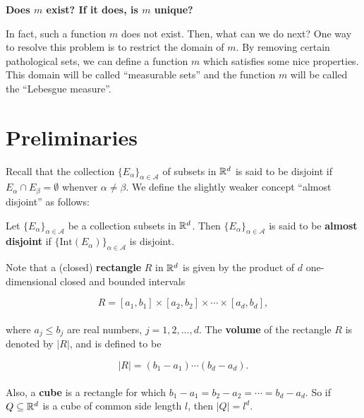 \documentclass[12pt, a4paper, openany, twoside]{book}
\theoremstyle{definition}
\theoremstyle{remark}
\newcommand{\Int}{{\mathrm{Int}}}
\theoremstyle{plain}
\numberwithin{equation}{section}
\begin{document}
\vspace{5mm}
\large\textbf{Does $m$ exist? If it does, is $m$ unique?}
\vspace{5mm}
\normalsize

In fact, such a function $m$ does not exist. Then, what can we do next? One way to resolve this problem is to restrict the domain of $m$. 
By removing certain pathological sets, we can define a function $m$ which satisfies some nice properties. This domain will be called ``measurable sets'' and the function $m$ will be called the ``Lebesgue measure''.

\vspace{5mm}
\section{Preliminaries}\mbox{}

Recall that the collection $\{E_\alpha\}_{\alpha\in\mathcal{A}}$ of subsets in ${\mathbb {R}}^d$ is said to be disjoint if $E_\alpha\cap E_\beta=\emptyset$ whenver $\alpha\neq\beta$. We define the slightly weaker concept ``almost disjoint'' as follows:

\vspace{5mm}
\begin{tcolorbox}[colback=yellow!10!white,colframe=blue!75!black,title=Definition 1.1.1]\label{Definition 1.1.1}
    Let $\{E_\alpha\}_{\alpha\in\mathcal{A}}$ be a collection subsets in ${\mathbb {R}}^d$. Then $\{E_\alpha\}_{\alpha\in\mathcal{A}}$ is said to be \textbf{almost disjoint} if $\{\Int(E_\alpha)\}_{\alpha\in\mathcal{A}}$ is disjoint.
\end{tcolorbox}
\vspace{5mm}

Note that a (closed) \textbf{rectangle} $R$ in ${\mathbb {R}}^d$ is given by the product of $d$ one-dimensional closed and bounded intervals

\[R=[a_1,b_1]\times [a_2,b_2]\times\cdots\times[a_d,b_d],\]
\\
where $a_j\leq b_j$ are real numbers, $j=1,2,\dots, d$. The \textbf{volume} of the rectangle $R$ is denoted by $|R|$, and is defined to be

\[|R|=(b_1-a_1)\cdots (b_d-a_d).\]
\\
\indent Also, a \textbf{cube} is a rectangle for which $b_1-a_1=b_2-a_2=\cdots=b_d-a_d$. So if $Q\subseteq{\mathbb {R}}^d$ is a cube of common side length $l$, then $|Q|=l^d$.

\vspace{5mm}
\end{document}
